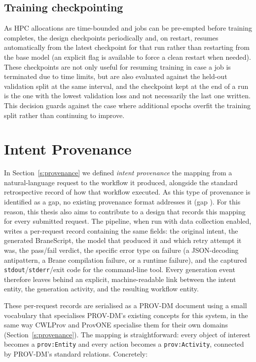 \subsection{Training checkpointing} 
As HPC allocations are time-bounded and jobs can be pre-empted before training completes, the
design checkpoints periodically and, on restart, resumes automatically from
the latest checkpoint for that run rather than restarting from the base
model (an explicit flag is available to force a clean restart when needed).
These checkpoints are not only useful for resuming training in case a job is terminated 
due to time limits, but are also evaluated against the held-out validation split at the same
interval, and the checkpoint kept at the end of a run is the one with the
lowest validation loss and not necessarily the last one written. This decision guards
against the case where additional epochs overfit the training split rather
than continuing to improve. 

\section{Intent Provenance}\label{s:design-provenance}

In Section~\ref{s:provenance} we defined \emph{intent provenance} the mapping
from a natural-language request to the workflow it produced, alongside the
standard retrospective record of how that workflow executed. As this type of provenance is identified as a gap, no
existing provenance format addresses it (gap ). For this reason, this thesis 
also aims to contribute to a design that records this mapping for every submitted request. 
The pipeline, when run with data collection enabled, writes a per-request 
record containing the same fields: the original intent,
the generated BraneScript, the model that produced it and which retry
attempt it was, the pass/fail verdict, the specific error type on failure
(a JSON-decoding antipattern, a Brane compilation failure, or a runtime
failure), and the captured
\texttt{stdout}/\texttt{stderr}/exit code for the command-line tool.
Every generation event therefore leaves behind an
explicit, machine-readable link between the intent entity, the generation
activity, and the resulting workflow entity.

These per-request records are serialised as a PROV-DM document using a small
vocabulary that specialises PROV-DM's existing concepts for this system,
in the same way CWLProv and ProvONE specialise them for their own domains
(Section~\ref{s:provenance}). The mapping is straightforward: every object
of interest becomes a \texttt{prov:Entity} and every action becomes a
\texttt{prov:Activity}, connected by PROV-DM's standard relations. Concretely:

